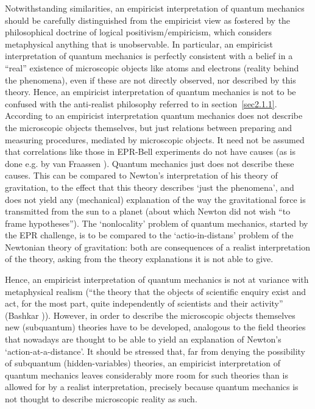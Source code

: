 \documentclass[12pt]{article}
\begin{document}
Notwithstanding similarities, an empiricist interpretation of
quantum mechanics should be carefully distinguished from the
empiricist view as fostered by the philosophical doctrine of
logical positivism/empiricism, which considers metaphysical
anything that is unobservable. In particular, an empiricist
interpretation of quantum mechanics is perfectly consistent with a
belief in a ``real'' existence of microscopic objects like atoms
and electrons (reality behind the phenomena), even if these are
not directly observed, nor described by this theory. Hence, an
empiricist interpretation of quantum mechanics is not to be
confused with the anti-realist philosophy referred to in
section~\ref{sec2.1.1}. According to an empiricist interpretation
quantum mechanics does not describe the microscopic objects
themselves, but just relations between preparing and measuring
procedures, mediated by microscopic objects. It need not be
assumed that correlations like those in EPR-Bell experiments do
not have causes (as is done e.g. by van Fraassen \cite{vF91}).
Quantum mechanics just does not describe these causes. This can be
compared to Newton's interpretation of his theory of gravitation,
to the effect that this theory describes `just the phenomena', and
does not yield any (mechanical) explanation of the way the
gravitational force is transmitted from the sun to a planet (about
which Newton did not wish ``to frame hypotheses''). The
`nonlocality' problem of quantum mechanics, started by the EPR
challenge, is to be compared to the `actio-in-distans' problem of
the Newtonian theory of gravitation: both are consequences of a
realist interpretation of the theory, asking from the theory
explanations it is not able to give.

Hence, an empiricist interpretation of quantum mechanics is not at
variance with metaphysical realism (``the theory that the objects
of scientific enquiry exist and act, for the most part, quite
independently of scientists and their activity'' (Bashkar
\cite{Bashkar})). However, in order to describe the microscopic
objects themselves new (subquantum) theories have to be developed,
analogous to the field theories that
nowadays are thought to be able to yield an explanation of
Newton's `action-at-a-distance'. It should be stressed that, far
from denying the possibility of subquantum (hidden-variables)
theories, an empiricist interpretation of quantum mechanics leaves
considerably more room for such theories than is allowed for by a
realist interpretation, precisely because quantum mechanics is not
thought to describe microscopic reality as such.
\end{document}

